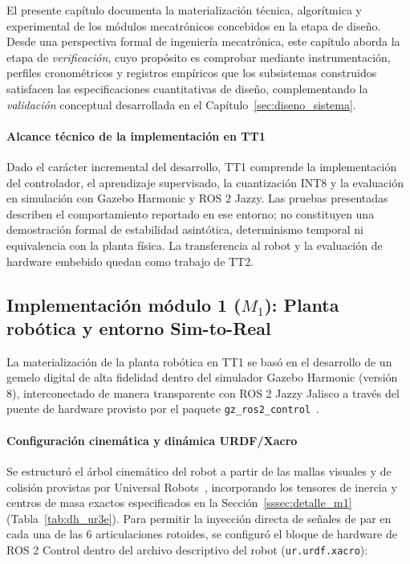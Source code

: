 \documentclass[12pt]{article}
\begin{document}
El presente capítulo documenta la materialización técnica, algorítmica y experimental de los módulos mecatrónicos concebidos en la etapa de diseño. Desde una perspectiva formal de ingeniería mecatrónica, este capítulo aborda la etapa de \textit{verificación}, cuyo propósito es comprobar mediante instrumentación, perfiles cronométricos y registros empíricos que los subsistemas construidos satisfacen las especificaciones cuantitativas de diseño, complementando la \textit{validación} conceptual desarrollada en el Capítulo~\ref{sec:diseno_sistema}.

\paragraph{Alcance técnico de la implementación en TT1}
Dado el carácter incremental del desarrollo, TT1 comprende la implementación del controlador, el aprendizaje supervisado, la cuantización INT8 y la evaluación en simulación con Gazebo Harmonic y ROS 2 Jazzy. Las pruebas presentadas describen el comportamiento reportado en ese entorno; no constituyen una demostración formal de estabilidad asintótica, determinismo temporal ni equivalencia con la planta física. La transferencia al robot y la evaluación de hardware embebido quedan como trabajo de TT2.


\subsection{Implementación módulo 1 ($M_1$): Planta robótica y entorno Sim-to-Real}
\label{sec:imp_m1}

La materialización de la planta robótica en TT1 se basó en el desarrollo de un gemelo digital de alta fidelidad dentro del simulador Gazebo Harmonic (versión 8), interconectado de manera transparente con ROS 2 Jazzy Jalisco a través del puente de hardware provisto por el paquete \texttt{gz\_ros2\_control}~\cite{macenski2022robot}.

\paragraph{Configuración cinemática y dinámica URDF/Xacro}
Se estructuró el árbol cinemático del robot a partir de las mallas visuales y de colisión provistas por Universal Robots~\cite{universal_robots_ur3e_manual}, incorporando los tensores de inercia y centros de masa exactos especificados en la Sección~\ref{sssec:detalle_m1} (Tabla~\ref{tab:dh_ur3e}). Para permitir la inyección directa de señales de par en cada una de las 6 articulaciones rotoides, se configuró el bloque de hardware de ROS 2 Control dentro del archivo descriptivo del robot (\texttt{ur.urdf.xacro}):
\end{document}
